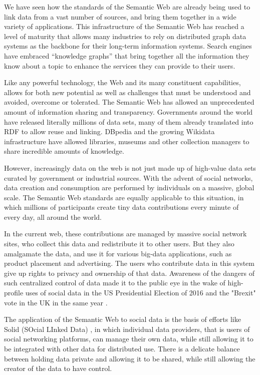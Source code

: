 We have seen how the standards of the Semantic Web are already being used to link data from 
a vast number of sources, and bring them together in a wide variety of applications.   This infrastructure 
of the Semantic Web has reached a level of maturity that allows many industries to rely
on distributed graph data systems
as the backbone for their long-term information systems. Search engines have 
embraced ``knowledge graphs'' that bring together all the information they 
know about a topic to enhance the services they can provide to their users.   


Like any powerful technology, the Web and its many constituent capabilities, allows for both
new potential as well as challenges that must be understood and avoided, overcome or tolerated.  The Semantic
Web has allowed an unprecedented amount of information sharing and  transparency.  Governments around
the world have released literally millions of data sets, many of them already translated into RDF to 
allow reuse and linking.  DBpedia and the growing Wikidata infrastructure have allowed libraries, 
museums and other collection managers to share incredible amounts of knowledge.

However, increasingly data on the web is not just made up of high-value data sets curated by government 
or industrial sources. With the advent of social networks, data creation and consumption are performed 
by individuals on a massive, global scale. The Semantic Web standards are equally applicable to this 
situation, in which millions of participants create tiny data contributions every minute of every day,
all around the world. 





In the current web, these contributions are managed by massive social network sites, who collect this data
and redistribute it to other users.  But they also amalgamate the data, and use it for various
big-data applications, such as product placement and advertising.  The users who contribute data
in this system give up rights to privacy and ownership of that data. Awareness of the dangers of such 
centralized control of data made it to the public
eye in the wake of high-profile uses of social data in the US Presidential Election of
2016 and the "Brexit" vote in the UK in the same year \cite{cambridge2018}. 


The application of the Semantic Web to social data is the basis of efforts like Solid (SOcial LInked Data)
\cite{berners2018one}, in which individual data providers, that is users of social networking platforms,
can manage their own data, while still allowing it to be integrated with other data for distributed use. 
There is a delicate balance between holding data private and allowing it to be shared, while still 
allowing the creator of the data to have control.  

